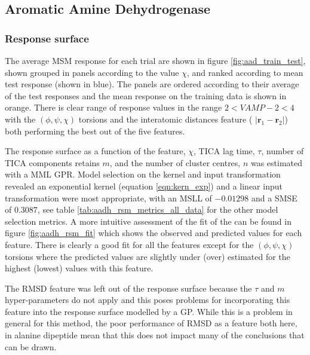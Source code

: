 \subsection{Aromatic Amine Dehydrogenase}\label{subsec:aadh}

\subsubsection{Response surface}\label{subsubsec:aadh_rsm}
The average MSM response for each trial are shown in figure \ref{fig:aad_train_test}, shown grouped in panels according to the value $\chi$,  and ranked according to mean test response (shown in blue). The panels are ordered according to their average of the test responses and the mean response on the training data is shown in orange. There is clear range of response values in the range $2 < VAMP-2 < 4$ with the $(\phi, \psi, \chi)$ torsions and the interatomic distances feature ( $\left|\mathbf{r}_{1}-\mathbf{r}_{2}\right|$) both performing the best out of the five features. 

The response surface as a function of the feature, $\chi$, TICA lag time, $\tau$, number of TICA components retains $m$, and the number of cluster centres, $n$ was estimated with a MML GPR. Model selection on the kernel and input transformation revealed an exponential kernel (equation \ref{eqn:kern_exp}) and a linear input transformation were most appropriate, with an MSLL of $-0.01298$ and a SMSE of $0.3087$, see table \ref{tab:aadh_rsm_metrics_all_data} for the other model selection metrics. A more intuitive assessment of the fit of the can be found in figure  \ref{fig:aadh_rsm_fit} which shows the observed and predicted values for each feature. There is clearly a good fit for all the features except for the $(\phi, \psi, \chi)$ torsions where the predicted values are slightly under (over) estimated for the highest (lowest) values with this feature. 

The RMSD feature was left out of the response surface because the $\tau$ and $m$ hyper-parameters do not apply and this poses problems for incorporating this feature into the response surface modelled by a GP.  While this is a problem in general for this method, the poor performance of RMSD as a feature both here, in alanine dipeptide mean that this does not impact many of the conclusions that can be drawn. 

